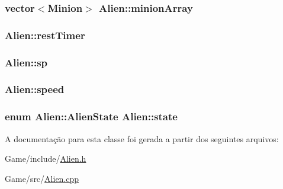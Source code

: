 \hypertarget{classAlien_a2ce0b76dc42b78ef26f1c524e428f682}{
\subsubsection[{minion\+Array}]{\setlength{\rightskip}{0pt plus 5cm}vector$<${\bf Minion}$>$ Alien\+::minion\+Array\hspace{0.3cm}{\ttfamily [private]}}}\label{classAlien_a2ce0b76dc42b78ef26f1c524e428f682}
\hypertarget{classAlien_a1045a69ebda8020e122db9021398098a}{
\subsubsection[{rest\+Timer}]{ Alien\+::rest\+Timer\hspace{0.3cm}{\ttfamily [private]}}}\label{classAlien_a1045a69ebda8020e122db9021398098a}
\hypertarget{classAlien_a353c0cf8e9bb3b689b34866b3c3ac0f7}{
\subsubsection[{sp}]{ Alien\+::sp\hspace{0.3cm}{\ttfamily [private]}}}\label{classAlien_a353c0cf8e9bb3b689b34866b3c3ac0f7}
\hypertarget{classAlien_a3acafe16e399a54c4d2511aad4f96cd4}{
\subsubsection[{speed}]{ Alien\+::speed\hspace{0.3cm}{\ttfamily [private]}}}\label{classAlien_a3acafe16e399a54c4d2511aad4f96cd4}
\hypertarget{classAlien_a595501207125bf8bb67a2b07c6e580dd}{
\subsubsection[{state}]{\setlength{\rightskip}{0pt plus 5cm}enum {\bf Alien\+::\+Alien\+State}  Alien\+::state\hspace{0.3cm}{\ttfamily [private]}}}\label{classAlien_a595501207125bf8bb67a2b07c6e580dd}


A documentação para esta classe foi gerada a partir dos seguintes arquivos\+:\begin{DoxyCompactItemize}
\item 
Game/include/\hyperlink{Alien_8h}{Alien.\+h}\item 
Game/src/\hyperlink{Alien_8cpp}{Alien.\+cpp}\end{DoxyCompactItemize}
